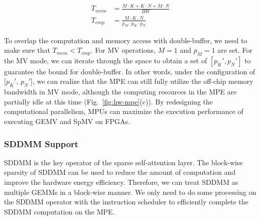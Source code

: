 \begin{equation}
\begin{aligned}
T_{mem} &= \frac{M \cdot K + K \cdot N + M \cdot N}{BW} \\
T_{cmp} &= \frac{M \cdot K \cdot N}{p_M \cdot p_K \cdot p_N}
\label{eq:design_space}
\end{aligned}
\end{equation}

To overlap the computation and memory access with double-buffer, we need to make sure that $T_{mem} < T_{cmp}$.
For MV operations, $M=1$ and $p_M=1$ are set.
For the MV mode, we can iterate through the space to obtain a set of $[p_K', p_N']$ to guarantee the bound for double-buffer.
In other words, under the configuration of [$p_K'$, $p_N'$], we can realize that the MPE can still fully utilize the off-chip memory bandwidth in MV mode, although the computing resources in the MPE are partially idle at this time (Fig.~\ref{fig:hw-mpe}(c)). By redesigning the computational parallelism, MPUs can maximize the execution performance of executing GEMV and SpMV on FPGAs.

\subsubsection{SDDMM Support}
SDDMM is the key operator of the sparse self-attention layer. The block-wise sparsity of SDDMM can be used to reduce the amount of computation and improve the hardware energy efficiency. Therefore, we can treat SDDMM as multiple GEMMs in a block-wise manner. We only need to do some processing on the SDDMM operator with the instruction scheduler to efficiently complete the SDDMM computation on the MPE.


